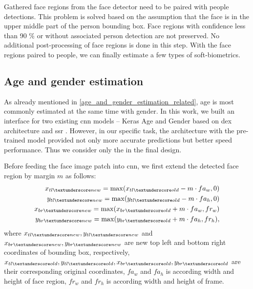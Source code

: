         Gathered face regions from the face detector need to be paired with people detections. This problem is solved based on the assumption that the face is in the upper middle part of the person bounding box. Face regions with confidence less than 90 \% or without associated person detection are not preserved. No additional post-processing of face regions is done in this step. With the face regions paired to people, we can finally estimate a few types of soft-biometrics.
        
        \subsection{Age and gender estimation}\label{age_gender_estimation}
            As already mentioned in \ref{age_and_gender_estimation_related}, age is most commonly estimated at the same time with gender. In this work, we built an interface for two existing \gls{cnn} models -- Keras Age and Gender \cite{kerasagender} based on \gls{dex} architecture and \gls{ssr} \cite{yang2018ssr}. However, in our specific task, the  architecture with the pre-trained model provided not only more accurate predictions but better speed performance. Thus we consider only the  in the final design. 
            
            Before feeding the face image patch into \gls{cnn}, we first extend the detected face region by margin $m$ as follows:
            \begin{align}
                x_{tl\textunderscore new} = \max(x_{tl\textunderscore old} - m \cdot fa_w, 0) \\
                y_{tl\textunderscore new} = \max(y_{tl\textunderscore old} - m \cdot fa_h, 0) \\
                x_{br\textunderscore new} = \max(x_{br\textunderscore old} + m \cdot fa_w, fr_w) \\
                y_{br\textunderscore new} = \max(y_{br\textunderscore old} + m \cdot fa_h, fr_h),
            \end{align}
            where $x_{tl\textunderscore new}, y_{tl\textunderscore new}$ and $x_{br\textunderscore new}, y_{br\textunderscore new}$ are new top left and bottom right coordinates of bounding box, respectively, $x_{tl\textunderscore old}, y_{tl\textunderscore old}, x_{br\textunderscore old}, y_{br\textunderscore old}$ are their corresponding original coordinates, $fa_w$ and  $fa_h$ is according width and height of face region,  $fr_w$ and $fr_h$ is according width and height of frame.
            
